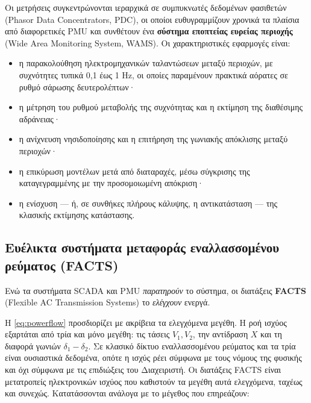 Οι μετρήσεις συγκεντρώνονται ιεραρχικά σε συμπυκνωτές δεδομένων φασιθετών (Phasor Data
Concentrators, PDC), οι οποίοι ευθυγραμμίζουν χρονικά τα πλαίσια από διαφορετικές PMU και
συνθέτουν ένα \textbf{σύστημα εποπτείας ευρείας περιοχής} (Wide Area Monitoring System,
WAMS). Οι χαρακτηριστικές εφαρμογές είναι:

\begin{itemize}
\item η παρακολούθηση ηλεκτρομηχανικών ταλαντώσεων μεταξύ περιοχών, με συχνότητες τυπικά
      0,1 έως 1 Hz, οι οποίες παραμένουν πρακτικά αόρατες σε ρυθμό σάρωσης δευτερολέπτων·
\item η μέτρηση του ρυθμού μεταβολής της συχνότητας και η εκτίμηση της διαθέσιμης
      αδράνειας·
\item η ανίχνευση νησιδοποίησης και η επιτήρηση της γωνιακής απόκλισης μεταξύ περιοχών·
\item η επικύρωση μοντέλων μετά από διαταραχές, μέσω σύγκρισης της καταγεγραμμένης με την
      προσομοιωμένη απόκριση·
\item η ενίσχυση — ή, σε συνθήκες πλήρους κάλυψης, η αντικατάσταση — της κλασικής εκτίμησης
      κατάστασης.
\end{itemize}

\subsection{Ευέλικτα συστήματα μεταφοράς εναλλασσομένου ρεύματος (FACTS)}

Ενώ τα συστήματα SCADA και PMU \emph{παρατηρούν} το σύστημα, οι διατάξεις \textbf{FACTS}
(Flexible AC Transmission Systems) το \emph{ελέγχουν} ενεργά.

Η \eqref{eq:powerflow} προσδιορίζει με ακρίβεια τα ελεγχόμενα μεγέθη. Η ροή ισχύος
εξαρτάται από τρία και μόνο μεγέθη: τις τάσεις $V_1, V_2$, την αντίδραση $X$ και τη διαφορά
γωνιών $\delta_1 - \delta_2$. Σε κλασικό δίκτυο εναλλασσομένου ρεύματος και τα τρία είναι
ουσιαστικά δεδομένα, οπότε η ισχύς ρέει σύμφωνα με τους νόμους της φυσικής και όχι σύμφωνα
με τις επιδιώξεις του Διαχειριστή. Οι διατάξεις FACTS είναι μετατροπείς ηλεκτρονικών ισχύος
που καθιστούν τα μεγέθη αυτά ελεγχόμενα, ταχέως και συνεχώς. Κατατάσσονται ανάλογα με το
μέγεθος που επηρεάζουν:

